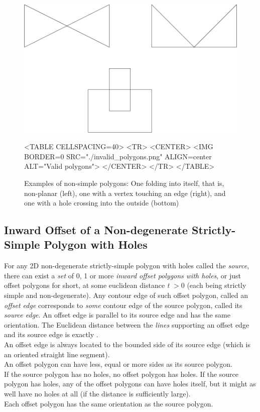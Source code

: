\begin{figure}[htbp]
\begin{ccTexOnly}
\begin{center}
\includegraphics{Straight_skeleton_2/invalid_polygons} %
\end{center}
\end{ccTexOnly}
\begin{ccHtmlOnly}
<TABLE CELLSPACING=40>
<TR>
<CENTER>
<IMG BORDER=0 SRC="./invalid_polygons.png" ALIGN=center ALT="Valid polygons">
</CENTER>
</TR>
</TABLE>
\end{ccHtmlOnly}
\caption{Examples of non-simple polygons: One folding into itself, that is, non-planar (left), one with a vertex touching an edge (right), and one with a hole crossing into the outside (bottom)
\label{Invalid-polygons}}
\end{figure}

\subsection{Inward Offset of a Non-degenerate Strictly-Simple Polygon with Holes}

For any 2D non-degenerate strictly-simple polygon with holes called the {\em source}, there can exist a \textit{set} of 0, 1 or more {\em inward offset polygons with holes}, or just offset polygons for short, at some euclidean distance \textit{t} $>0$ (each being strictly simple and non-degenerate). Any contour edge of such offset polygon, called an {\em offset edge} corresponds to \textit{some} contour edge of the source polygon, called its {\em source edge}. An offset edge is parallel to its source edge and has the same orientation. The Euclidean distance between the \textit{lines} supporting an offset edge and its source edge is exactly .\\
An offset edge is always located to the bounded side of its source edge (which is an oriented straight line segment).\\
An offset polygon can have less, equal or more sides as its source polygon.\\
If the source polygon has no holes, no offset polygon has holes. If the source polygon has holes, any of the offset polygons can have holes itself, but it might as well have no holes at all (if the distance is sufficiently large).\\
Each offset polygon has the same orientation as the source polygon.

